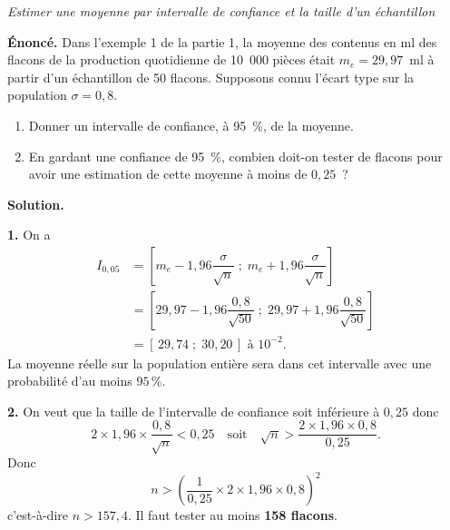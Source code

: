 \documentclass[11pt,a4paper]{article}
\begin{document}
\begin{exo}
\textit{Estimer une moyenne par intervalle de confiance et la taille d'un échantillon}
\medskip

\textbf{Énoncé.} Dans l'exemple 1 de la partie 1, la moyenne des contenus en ml des flacons de la production quotidienne de 10~000 pièces était $m_e = 29{,}97$~ml à partir d'un échantillon de 50 flacons. Supposons connu l'écart type sur la population $\sigma = 0{,}8$.

\begin{enumerate}[leftmargin=6mm]
\item Donner un intervalle de confiance, à 95~\%, de la moyenne.
\item En gardant une confiance de 95~\%, combien doit-on tester de flacons pour avoir une estimation de cette moyenne à moins de $0{,}25$~?
\end{enumerate}

\textbf{Solution.}

\textbf{1.} On a
\begin{align*}
I_{0{,}05} &= \left[ m_e - 1{,}96\dfrac{\sigma}{\sqrt{n}} \;;\; m_e + 1{,}96\dfrac{\sigma}{\sqrt{n}} \right] \\
&= \left[ 29{,}97 - 1{,}96\dfrac{0{,}8}{\sqrt{50}} \;;\; 29{,}97 + 1{,}96\dfrac{0{,}8}{\sqrt{50}} \right] \\
&= [\,29{,}74 \;;\; 30{,}20\,] \text{ à } 10^{-2}.
\end{align*}
La moyenne réelle sur la population entière sera dans cet intervalle avec une probabilité d'au moins $95\,\%$.

\textbf{2.} On veut que la taille de l'intervalle de confiance soit inférieure à $0{,}25$ donc
$$2 \times 1{,}96 \times \dfrac{0{,}8}{\sqrt{n}} < 0{,}25 \quad \text{soit} \quad \sqrt{n} > \dfrac{2 \times 1{,}96 \times 0{,}8}{0{,}25}.$$
Donc
$$n > \left( \dfrac{1}{0{,}25} \times 2 \times 1{,}96 \times 0{,}8 \right)^{2}$$
c'est-à-dire $n > 157{,}4$. Il faut tester au moins \textbf{158 flacons}.
\end{exo}
\end{document}
